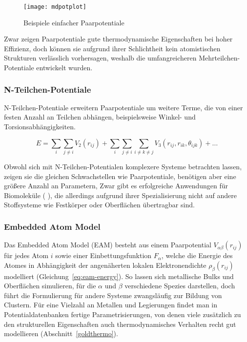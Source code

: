 \begin{figure}
  \centering
  \texttt{[image: mdpotplot]}
  \caption{Beispiele einfacher Paarpotentiale}
  \label{fig:mdpairpotentials}
\end{figure}

Zwar zeigen Paarpotentiale gute thermodynamische Eigenschaften bei hoher Effizienz, doch können sie aufgrund ihrer Schlichtheit kein atomistischen Strukturen verlässlich vorhersagen, weshalb die umfangreicheren Mehrteilchen-Potentiale entwickelt wurden.

\subsubsection{N-Teilchen-Potentiale}

N-Teilchen-Potentiale erweitern Paarpotentiale um weitere Terme, die von einer festen Anzahl an Teilchen abhängen, beispielsweise Winkel- und Torsionsabhängigkeiten.

\begin{equation}
  \label{eq:nbody-energy}
  E = \sum_i\sum_{j \neq i}{V_2\left(r_{ij}\right)} + \sum_i\sum_{j \neq i}\sum_{i \neq k \neq j}{V_3\left(r_{ij}, r_{ik}, \theta_{ijk}\right)} + \dots
\end{equation}

Obwohl sich mit N-Teilchen-Potentialen komplexere Systeme betrachten lassen, zeigen sie die gleichen Schwachstellen wie Paarpotentiale, benötigen aber eine größere Anzahl an Parametern,
Zwar gibt es erfolgreiche  Anwendungen für Biomoleküle (  ), die allerdings aufgrund ihrer Spezialisierung nicht auf andere Stoffsysteme wie Festkörper oder Oberflächen übertragbar sind.

\subsubsection{Embedded Atom Model}

Das Embedded Atom Model (EAM) besteht aus einem Paarpotential $V_{\alpha\beta}(r_{ij})$ für jedes Atom $i$ sowie einer Einbettungsfunktion $F_\alpha$, welche die Energie des Atomes in Abhängigkeit der angenäherten lokalen Elektronendichte $\rho_\beta(r_{ij})$ modelliert (Gleichung~\ref{eq:eam-energy}).
So lassen sich metallische Bulks und Oberflächen simulieren, für die $\alpha$ und $\beta$ verschiedene Spezies darstellen, doch führt die Formulierung für andere Systeme zwangsläufig zur Bildung von Clustern.
Für eine Vielzahl an Metallen und Legierungen findet man in Potentialdatenbanken fertige Parametrisierungen, von denen viele zusätzlich zu den strukturellen Eigenschaften auch thermodynamisches Verhalten recht gut modellieren (Abschnitt~\ref{goldthermo}).

